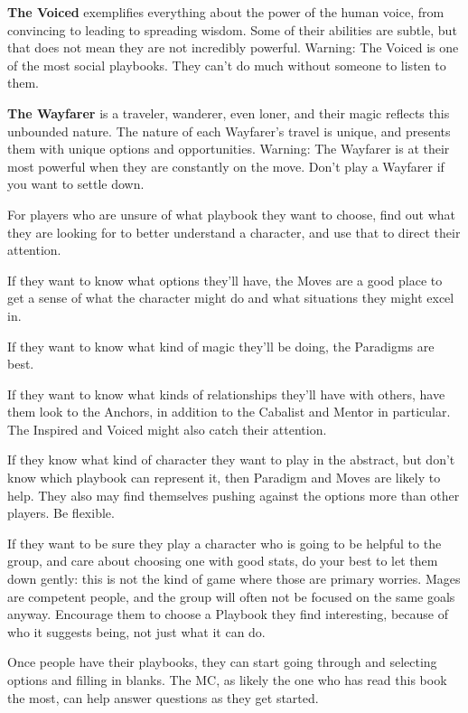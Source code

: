\documentclass[
  oneside,
  statementpaper,
  9pt]{memoir}
\begin{document}
\textbf{The Voiced }exemplifies everything about the power of the human
voice, from convincing to leading to spreading wisdom. Some of their
abilities are subtle, but that does not mean they are not incredibly
powerful. Warning: The Voiced is one of the most social playbooks. They
can't do much without someone to listen to them.

\textbf{The Wayfarer} is a traveler, wanderer, even loner, and their
magic reflects this unbounded nature. The nature of each Wayfarer's
travel is unique, and presents them with unique options and
opportunities. Warning: The Wayfarer is at their most powerful when they
are constantly on the move. Don't play a Wayfarer if you want to settle
down.

For players who are unsure of what playbook they want to choose, find
out what they are looking for to better understand a character, and use
that to direct their attention.

If they want to know what options they'll have, the Moves are a good
place to get a sense of what the character might do and what situations
they might excel in.

If they want to know what kind of magic they'll be doing, the Paradigms
are best.

If they want to know what kinds of relationships they'll have with
others, have them look to the Anchors, in addition to the Cabalist and
Mentor in particular. The Inspired and Voiced might also catch their
attention.

If they know what kind of character they want to play in the abstract,
but don't know which playbook can represent it, then Paradigm and Moves
are likely to help. They also may find themselves pushing against the
options more than other players. Be flexible.

If they want to be sure they play a character who is going to be helpful
to the group, and care about choosing one with good stats, do your best
to let them down gently: this is not the kind of game where those are
primary worries. Mages are competent people, and the group will often
not be focused on the same goals anyway. Encourage them to choose a
Playbook they find interesting, because of who it suggests being, not
just what it can do.

Once people have their playbooks, they can start going through and
selecting options and filling in blanks. The MC, as likely the one who
has read this book the most, can help answer questions as they get
started.
\end{document}
